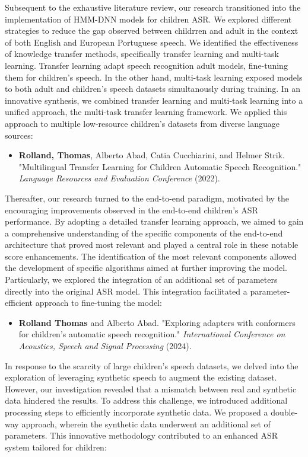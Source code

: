 Subsequent to the exhaustive literature review, our research transitioned into the implementation of \ac{HMM-DNN} models for children \ac{ASR}.  We explored different strategies to reduce the gap observed between childrren and adult in the context of both English and European Portuguese speech. We identified the effectiveness of knowledge transfer methods, specifically transfer learning and multi-task learning. Transfer learning adapt speech recognition adult models, fine-tuning them for children's speech. In the other hand, multi-task learning exposed models to both adult and children's speech datasets simultanously during training. In an innovative synthesis, we combined transfer learning and multi-task learning into a unified approach, the multi-task transfer learning framework. We applied this approach to multiple low-resource children's datasets from diverse language sources:
\begin{itemize}
    \item \textbf{Rolland, Thomas}, Alberto Abad, Catia Cucchiarini, and Helmer Strik. "Multilingual Transfer Learning for Children Automatic Speech Recognition." \textit{ Language Resources and Evaluation Conference} (2022).
\end{itemize}

Thereafter, our research turned to the end-to-end paradigm, motivated by the encouraging improvements observed in the end-to-end children's \ac{ASR} performance. By adopting a detailed transfer learning approach, we aimed to gain a comprehensive understanding of the specific components of the end-to-end architecture that proved most relevant and played a central role in these notable score enhancements. The identification of the most relevant components allowed the development of specific algorithms aimed at further improving the model. Particularly, we explored the integration of an additional set of parameters directly into the original \ac{ASR} model. This integration facilitated a parameter-efficient approach to fine-tuning the model:

\begin{itemize}
    \item \textbf{Rolland Thomas} and Alberto Abad. "Exploring adapters with conformers for children’s automatic speech recognition." \textit{ International Conference on Acoustics, Speech and Signal Processing} (2024).
\end{itemize}

In response to the scarcity of large children's speech datasets, we delved into the exploration of leveraging synthetic speech to augment the existing dataset. However, our investigation revealed that a mismatch between real and synthetic data hindered the results. To address this challenge, we introduced additional processing steps to efficiently incorporate synthetic data. We proposed a double-way approach, wherein the synthetic data underwent an additional set of parameters. This innovative methodology contributed to an enhanced \ac{ASR} system tailored for children:

